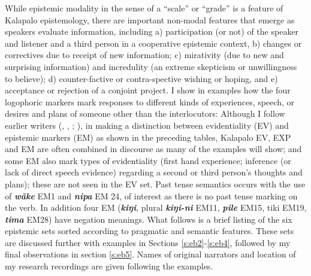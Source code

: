 \documentclass[output=paper]{langsci/langscibook}
\begin{document}
While epistemic modality in the sense of a “scale” or “grade” is a feature of Kalapalo epistemology, there are important non-modal features that emerge as speakers evaluate information, including a) participation (or not)  of the speaker and listener and a third person in a cooperative epistemic context, b) changes or correctives due to receipt of new information; c) mirativity (due to new and surprising information) and incredulity (an extreme skepticism or unwillingness to believe); d) counter-factive or contra-spective wishing or hoping, and e) acceptance or rejection of a conjoint project.  I show in examples how the four logophoric markers mark responses to different kinds of experiences, speech, or desires and plans of someone other than the interlocutors:  
Although I follow earlier writers (\citealt{Aikhenvald2004}, \citealt{Haan1999}, \citeyear{Haan2001}; \citealt{NuckollsLev2012}), in making a distinction between evidentiality (EV) and epistemic markers (EM) as shown in the preceding tables,   Kalapalo EV, EXP and EM are often combined in discourse as many of the examples will show; and some EM also mark types of evidentiality (first hand experience; inference (or lack of direct speech evidence) regarding a second or third person’s thoughts and plans); these are not seen in the EV set.  Past tense semantics occurs with the use of \textbf{\textit{wãke}} EM1 and \textbf{\textit{nipa}} EM 24, of interest as there is no past tense marking on the verb.  In addition four EM (\textbf{\textit{kiŋi}}, plural \textbf{\textit{kiŋi-ni}} EM11, \textbf{\textit{pile}} EM15, tiki EM19,  \textbf{\textit{tima}} EM28)  have negation meanings.  What follows is a brief listing of the six epistemic sets sorted according to pragmatic and semantic features. These sets are discussed further with examples in Sections \ref{s:eb2}-\ref{s:eb4}, followed by my final observations in section \ref{s:eb5}.  Names of original narrators and location of my research recordings are given following the examples.	
	
\end{document}
